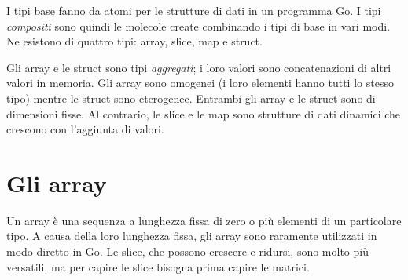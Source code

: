 I tipi base fanno da atomi per le strutture di dati in un programma Go.
I tipi \textit{compositi} sono quindi le molecole create combinando i tipi di base in vari modi.
Ne esistono di quattro tipi: array, slice, map e struct.

Gli array e le struct sono tipi \textit{aggregati};
i loro valori sono concatenazioni di altri valori in memoria.
Gli array sono omogenei (i loro elementi hanno tutti lo stesso tipo) mentre le struct sono eterogenee.
Entrambi gli array e le struct sono di dimensioni fisse.
Al contrario, le slice e le map sono strutture di dati dinamici che crescono con l'aggiunta di valori.


\section{Gli array}
\label{sec:gli_array}%
Un array è una sequenza a lunghezza fissa di zero o più elementi di un particolare tipo.
A causa della loro lunghezza fissa, gli array sono raramente utilizzati in modo diretto in Go.
Le slice, che possono crescere e ridursi, sono molto più versatili, ma per capire le slice bisogna prima capire le matrici.

